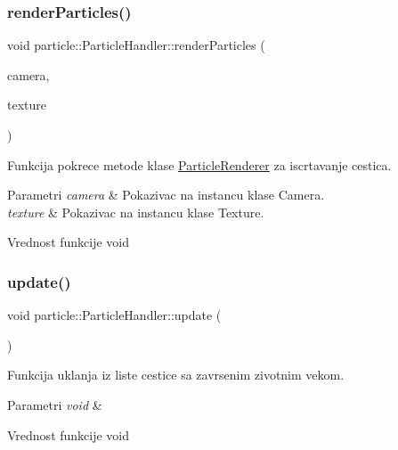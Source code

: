 \subsubsection{\texorpdfstring{render\+Particles()}{renderParticles()}}
{\footnotesize\ttfamily void particle\+::\+Particle\+Handler\+::render\+Particles (\begin{DoxyParamCaption}\item[{\hyperlink{classentity_1_1Camera}{Camera} $\ast$}]{camera,  }\item[{\hyperlink{classtexture_1_1Texture}{Texture} $\ast$}]{texture }\end{DoxyParamCaption})}



Funkcija pokrece metode klase \hyperlink{classparticle_1_1ParticleRenderer}{Particle\+Renderer} za iscrtavanje cestica. 


\begin{DoxyParams}{Parametri}
{\em camera} & Pokazivac na instancu klase Camera. \\
\hline
{\em texture} & Pokazivac na instancu klase Texture. \\
\hline
\end{DoxyParams}
\begin{DoxyReturn}{Vrednost funkcije}
void 
\end{DoxyReturn}
\mbox{\label{classparticle_1_1ParticleHandler_ac0b409fc65e725cb7fe73534807437a1}} 
\subsubsection{\texorpdfstring{update()}{update()}}
{\footnotesize\ttfamily void particle\+::\+Particle\+Handler\+::update (\begin{DoxyParamCaption}{ }\end{DoxyParamCaption})}



Funkcija uklanja iz liste cestice sa zavrsenim zivotnim vekom. 


\begin{DoxyParams}{Parametri}
{\em void} & \\
\hline
\end{DoxyParams}
\begin{DoxyReturn}{Vrednost funkcije}
void 
\end{DoxyReturn}



